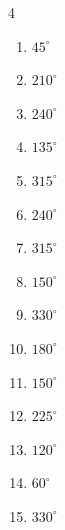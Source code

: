 \begin{multicols}{4}
\begin{enumerate}
  \item $\displaystyle 45^{\circ}$

  \item $\displaystyle 210^{\circ}$

  \item $\displaystyle 240^{\circ}$

  \item $\displaystyle 135^{\circ}$

  \item $\displaystyle 315^{\circ}$

  \item $\displaystyle 240^{\circ}$

  \item $\displaystyle 315^{\circ}$

  \item $\displaystyle 150^{\circ}$

  \item $\displaystyle 330^{\circ}$

  \item $\displaystyle 180^{\circ}$
        \phantom{$\displaystyle =\pi$}

  \item $\displaystyle 150^{\circ}$

  \item $\displaystyle 225^{\circ}$

  \item $\displaystyle 120^{\circ}$

\columnbreak %

\resetques

  \item $\displaystyle 60^{\circ}$

  \item $\displaystyle 330^{\circ}$


\end{enumerate}
\end{multicols}
